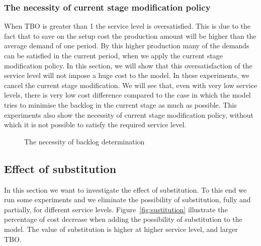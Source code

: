\documentclass[10pt]{article}
\begin{document}
\subsubsection{The necessity of current stage modification policy}
    When TBO is greater than 1 the service level is oversatisfied. This is due to the fact that to save on the setup cost the production amount will be higher than the average demand of one period. By this higher production many of the demands can be satisfied in the current period, when we apply the current stage modification policy. In this section, we will show that this oversatisfaction of the service level will not impose a huge cost to the model. In these experiments, we cancel the current stage modification. We will see that, even with very low service levels, there is very low cost difference compared to the case in which the model tries to minimise the backlog in the current stage as much as possible. This experiments also show the necessity of current stage modification policy, without which it is not possible to satisfy the required service level.
    
    
\begin{figure} [H]
    \centering
    \caption{The necessity of backlog determination}%
    \label{fig:TBOComp}%
\end{figure}




\subsection{Effect of substitution}

In this section we want to investigate the effect of substitution. To this end we run some experiments and we eliminate the possibility of substitution, fully and partially, for different service levels. Figure~\ref{fig:sustitution} illustrate the percentage of cost decrease when adding the possibility of substitution to the model. The value of substitution is higher at higher service level, and larger TBO.

\end{document}
